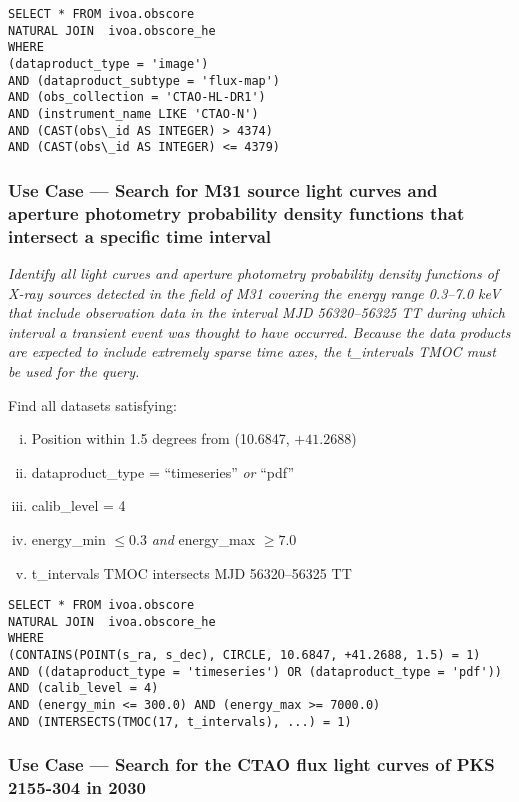 \begin{verbatim}
SELECT * FROM ivoa.obscore
NATURAL JOIN  ivoa.obscore_he 
WHERE
(dataproduct_type = 'image')
AND (dataproduct_subtype = 'flux-map')
AND (obs_collection = 'CTAO-HL-DR1')
AND (instrument_name LIKE 'CTAO-N')
AND (CAST(obs\_id AS INTEGER) > 4374)
AND (CAST(obs\_id AS INTEGER) <= 4379)
\end{verbatim}


\subsubsection{Use Case --- Search for M31 source light curves and aperture photometry probability density functions that intersect a specific time interval}

{\em Identify all light curves and aperture photometry probability density functions of X-ray sources detected in the field of M31 covering the energy range 0.3--7.0 keV that include observation data in the interval MJD 56320--56325 TT during which interval a transient event was thought to have occurred.  Because the data products are expected to include extremely sparse time axes, the t\_intervals TMOC must be used for the query.\/}

\medskip
\noindent Find all datasets satisfying:
\begin{enumerate}[(i)]
  \item Position within 1.5 degrees from (10.6847, $+41.2688$)
  \item dataproduct\_type = ``timeseries'' {\em or\/} ``pdf''
  \item calib\_level = 4
  \item energy\_min $\leq 0.3$ {\em and\/} energy\_max $\geq 7.0$
  \item t\_intervals TMOC intersects MJD 56320--56325 TT
\end{enumerate}


\begin{verbatim}
SELECT * FROM ivoa.obscore
NATURAL JOIN  ivoa.obscore_he 
WHERE
(CONTAINS(POINT(s_ra, s_dec), CIRCLE, 10.6847, +41.2688, 1.5) = 1) 
AND ((dataproduct_type = 'timeseries') OR (dataproduct_type = 'pdf'))
AND (calib_level = 4)
AND (energy_min <= 300.0) AND (energy_max >= 7000.0)
AND (INTERSECTS(TMOC(17, t_intervals), ...) = 1)
\end{verbatim}

\subsubsection{Use Case --- Search for the CTAO flux light curves of PKS 2155-304 in 2030}

